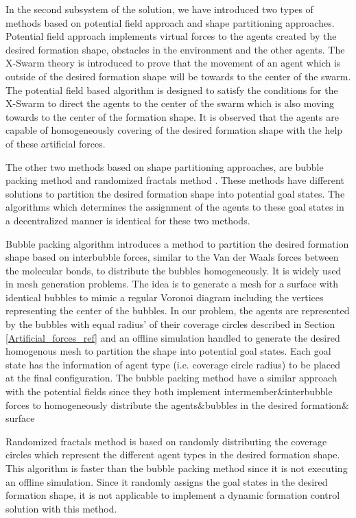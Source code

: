 In the second subsystem of the solution, we have introduced two types of methods based on potential field approach and shape partitioning approaches. Potential field approach implements virtual forces to the agents created by the desired formation shape, obstacles in the environment and the other agents. The X-Swarm theory is introduced to prove that the movement of an agent which is outside of the desired formation shape will be towards to the center of the swarm. The potential field based algorithm is designed to satisfy the conditions for the X-Swarm to direct the agents to the center of the swarm which is also moving towards to the center of the formation shape. It is observed that the agents are capable of homogeneously covering of the desired formation shape with the help of these artificial forces.

The other two methods based on shape partitioning approaches, are bubble packing method and randomized fractals method . These methods have different solutions to partition the desired formation shape into potential goal states. The algorithms which determines the assignment of the agents to these goal states in a decentralized manner is identical for these two methods. 

Bubble packing algorithm introduces a method to partition the desired formation shape based on interbubble forces, similar to the Van der Waals forces between the molecular bonds, to distribute the bubbles homogeneously. It is widely used in mesh generation problems. The idea is to generate a mesh for a surface with identical bubbles to mimic a regular Voronoi diagram including the vertices representing the center of the bubbles. In our problem, the agents are represented by the  bubbles with equal radius' of their coverage circles described in Section \ref{Artificial_forces_ref} and an offline simulation handled to generate the desired homogenous mesh to partition the shape into potential goal states. Each goal state has the information of agent type (i.e. coverage circle radius) to be placed at the final configuration. The bubble packing method have a similar approach with the potential fields since they both implement intermember$\&$interbubble forces to homogeneously distribute the agents$\&$bubbles in the desired formation$\&$surface 
       
Randomized fractals method is based on randomly distributing the coverage circles which represent the different agent types in the desired formation shape. This algorithm is faster than the bubble packing method since it is not executing an offline simulation. Since it randomly assigns the goal states in the desired formation shape, it is not applicable to implement a dynamic formation control solution with this method. 
       
